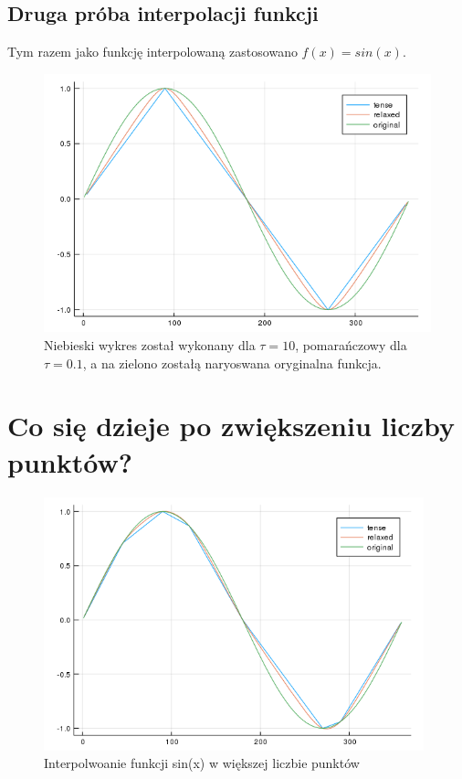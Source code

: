 \documentclass{article}
\begin{document}
\subsection{Druga próba interpolacji funkcji}
Tym razem jako funkcję interpolowaną zastosowano $f(x) = sin(x)$.
\begin{figure}[ht]
  \begin{center}
  \includegraphics[width=15cm]{sin}
  \end{center}
  \caption{Niebieski wykres został wykonany dla $\tau = 10$, pomarańczowy dla $\tau = 0.1$, a na zielono zostałą naryoswana oryginalna funkcja.}
  \label{fig:rysunek}
\end{figure}
\newpage
\section{Co się dzieje po zwiększeniu liczby punktów?}
\begin{figure}[ht]
  \begin{center}
  \includegraphics[width=11cm]{sin1}
  \end{center}
  \caption{Interpolwoanie funkcji sin(x) w większej liczbie punktów}
  \label{fig:rysunek}
\end{figure}
\end{document}
